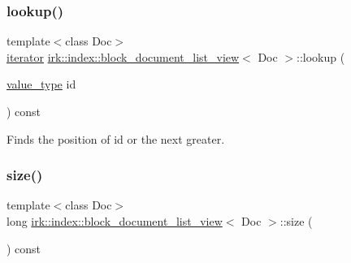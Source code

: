 \mbox{\label{classirk_1_1index_1_1block__document__list__view_a550147f841ed69dc287660b996dc6a1f}} 
\subsubsection{\texorpdfstring{lookup()}{lookup()}}
{\footnotesize\ttfamily template$<$class Doc$>$ \\
\mbox{\hyperlink{classirk_1_1index_1_1block__document__list__view_ac9190c4c0eb1b9cc20a1b6a5fbea1d80}{iterator}} \mbox{\hyperlink{classirk_1_1index_1_1block__document__list__view}{irk\+::index\+::block\+\_\+document\+\_\+list\+\_\+view}}$<$ Doc $>$\+::lookup (\begin{DoxyParamCaption}\item[{\mbox{\hyperlink{classirk_1_1index_1_1block__document__list__view_a0741459717c42674c1cfe069ee876344}{value\+\_\+type}}}]{id }\end{DoxyParamCaption}) const\hspace{0.3cm}{\ttfamily [inline]}}



Finds the position of {\ttfamily id} or the next greater. 

\mbox{\label{classirk_1_1index_1_1block__document__list__view_ac531dcc96c79705a76cbe2f0bf5a0d99}} 
\subsubsection{\texorpdfstring{size()}{size()}}
{\footnotesize\ttfamily template$<$class Doc$>$ \\
long \mbox{\hyperlink{classirk_1_1index_1_1block__document__list__view}{irk\+::index\+::block\+\_\+document\+\_\+list\+\_\+view}}$<$ Doc $>$\+::size (\begin{DoxyParamCaption}{ }\end{DoxyParamCaption}) const\hspace{0.3cm}{\ttfamily [inline]}}



